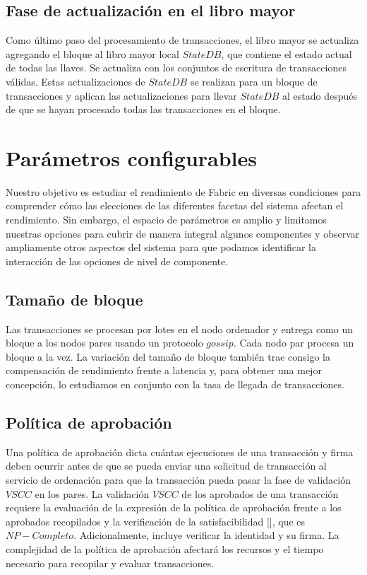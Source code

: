 \subsection{Fase de actualizaci\'on en el libro mayor}
Como \'ultimo paso del procesamiento de transacciones, el libro mayor se actualiza agregando el bloque al libro mayor local $StateDB$, que contiene el estado actual de todas las llaves. Se actualiza con los conjuntos de escritura de transacciones v\'alidas. Estas actualizaciones de $StateDB$ se realizan para un bloque de transacciones y aplican las actualizaciones para llevar $StateDB$ al estado despu\'es de que se hayan procesado todas las transacciones en el bloque.

\section{Par\'ametros configurables}
Nuestro objetivo es estudiar el rendimiento de Fabric en diversas condiciones para comprender c\'omo las elecciones de las diferentes facetas del sistema afectan el rendimiento. Sin embargo, el espacio de par\'ametros es amplio y limitamos nuestras opciones para cubrir de manera integral algunos componentes y observar ampliamente otros aspectos del sistema para que podamos identificar la interacci\'on de las opciones de nivel de componente.

\subsection{Tama\~no de bloque}
Las transacciones se procesan por lotes en el nodo ordenador y entrega como un bloque a los nodos pares usando un protocolo $gossip$. Cada nodo par procesa un bloque a la vez. La variaci\'on del tama\~no de bloque tambi\'en trae consigo la compensaci\'on de rendimiento frente a latencia y, para obtener una mejor concepci\'on, lo estudiamos en conjunto con la tasa de llegada de transacciones.

\subsection{Pol\'itica de aprobaci\'on}
Una pol\'itica de aprobaci\'on dicta cu\'antas ejecuciones de una transacci\'on y firma deben ocurrir antes de que se pueda enviar una solicitud de transacci\'on al servicio de ordenaci\'on para que la transacci\'on pueda pasar la fase de validaci\'on $VSCC$ en los pares. La validaci\'on $VSCC$ de los aprobados de una transacci\'on requiere la evaluaci\'on de la expresi\'on de la pol\'itica de aprobaci\'on frente a los aprobados recopilados y la verificaci\'on de la satisfacibilidad [\cite{gottlieb2002evolutionary}], que es $NP-Completo$. Adicionalmente, incluye verificar la identidad y su firma. La complejidad de la pol\'itica de aprobaci\'on afectar\'a los recursos y el tiempo necesario para recopilar y evaluar transacciones.

